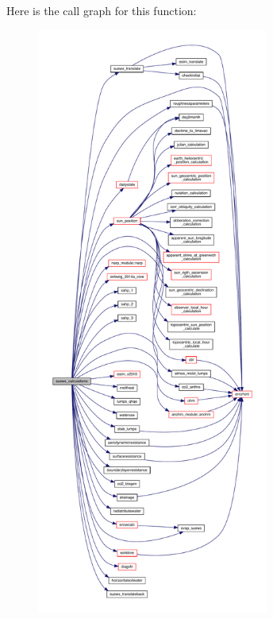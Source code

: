 Here is the call graph for this function\+:\nopagebreak
\begin{figure}[H]
\begin{center}
\leavevmode
\includegraphics[height=550pt]{_s_u_e_w_s___calculations_8f95_a178f1acf059ccbc65e48be6eb7f37baf_cgraph}
\end{center}
\end{figure}
